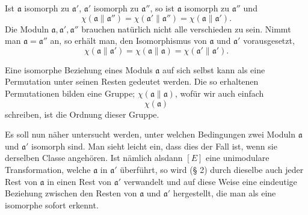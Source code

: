 \documentclass[11pt,a4paper]{article}
\begin{document}
Ist $\mathfrak a$ isomorph zu $\mathfrak a'$, $\mathfrak a'$ isomorph zu $\mathfrak a''$, so ist $\mathfrak a$ isomorph zu $\mathfrak a''$ und
\[
 \chi(\mathfrak a\parallel\mathfrak a'')=
 \chi(\mathfrak a'\parallel\mathfrak a'')=
 \chi(\mathfrak a\parallel\mathfrak a').
\]
Die Moduln $\mathfrak a,\mathfrak a',\mathfrak a''$ brauchen natürlich nicht alle verschieden zu sein. Nimmt man $\mathfrak a=\mathfrak a''$ an, so erhält man, den Isomorphismus von $\mathfrak a$ und $\mathfrak a'$ vorausgesetzt,
\[
 \chi(\mathfrak a\parallel\mathfrak a')=
 \chi(\mathfrak a\parallel\mathfrak a)=
 \chi(\mathfrak a'\parallel\mathfrak a').
\]

Eine isomorphe Beziehung eines Moduls $\mathfrak a$ auf sich selbst kann als eine Permutation unter seinen Resten gedeutet werden. Die so erhaltenen Permutationen bilden eine Gruppe; $\chi(\mathfrak a\parallel\mathfrak a)$, wofür wir auch einfach
\[
 \chi(\mathfrak a)
\]
schreiben, ist die Ordnung dieser Gruppe.

Es soll nun näher untersucht werden, unter welchen Bedingungen zwei Moduln $\mathfrak a$ und $\mathfrak a'$ isomorph sind. Man sieht leicht ein, dass dies der Fall ist, wenn sie derselben Classe angehören. Ist nämlich alsdann $[E]$ eine unimodulare Transformation, welche $\mathfrak a$ in $\mathfrak a'$ überführt, so wird (§ 2) durch dieselbe auch jeder Rest von $\mathfrak a$ in einen Rest von $\mathfrak a'$ verwandelt und auf diese Weise eine eindeutige Beziehung zwischen den Resten von $\mathfrak a$ und $\mathfrak a'$ hergestellt, die man als eine isomorphe sofort erkennt.
\end{document}
